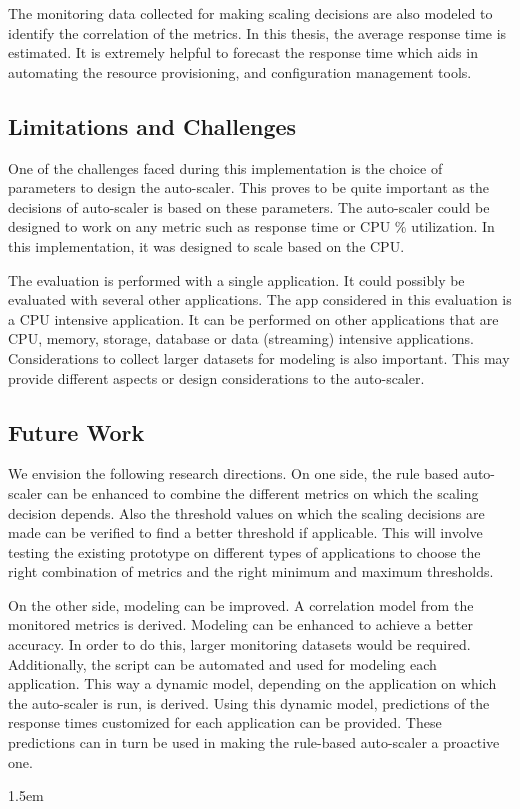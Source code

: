 \documentclass[article,type=msc,colorback,12pt,accentcolor=tud8b,table]{tudthesis}
\begin{document}
The monitoring data collected for making scaling decisions are also modeled to identify the correlation of the metrics. In this thesis, the average response time is estimated. It is extremely helpful to forecast the response time which aids in automating the resource provisioning, and configuration management tools. 

 \subsection{Limitations and Challenges}	
 
 One of the challenges faced during this implementation is the choice of parameters to design the auto-scaler. This proves to be quite important as the decisions of auto-scaler is based on these parameters. The auto-scaler could be designed to work on any metric such as response time or CPU \% utilization. In this implementation, it was designed to scale based on the CPU. 
 
 The evaluation is performed with a single application. It could possibly be evaluated with several other applications. The app considered in this evaluation is a CPU intensive application. It can be performed on other applications that are CPU, memory, storage, database or data (streaming) intensive applications. Considerations to collect larger datasets for modeling is also important. This may provide different aspects or design considerations to the auto-scaler.
 
 
\subsection{Future Work}

We envision the following research directions. On one side, the rule based auto-scaler can be enhanced to combine the different metrics on which the scaling decision depends. Also the threshold values on which the scaling decisions are made can be verified to find a better threshold if applicable. This will involve testing the existing prototype on different types of applications to choose the right combination of metrics and the right minimum and maximum thresholds. 

On the other side, modeling can be improved. A correlation model from the monitored metrics is derived. Modeling can be enhanced to achieve a better accuracy. In order to do this, larger monitoring datasets would be required. Additionally, the script can be automated and used for modeling each application. This way a dynamic model, depending on the application on which the auto-scaler is run, is derived. Using this dynamic model, predictions of the response times customized for each application can be provided. These predictions can in turn be used in making the rule-based auto-scaler a proactive one. 

\clearpage
 \hfill  

\emergencystretch 1.5em

	  

\clearpage

\printglossary
\clearpage
\end{document}
